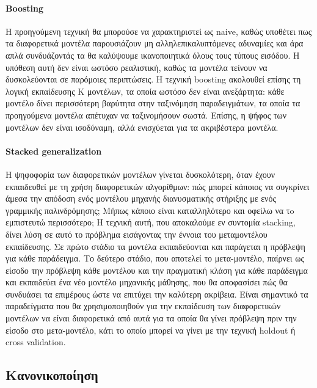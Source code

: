 \documentclass{article}
\begin{document}
\paragraph{Boosting} Η προηγούμενη τεχνική θα μπορούσε να χαρακτηριστεί ως naive, καθώς υποθέτει πως τα διαφορετικά μοντέλα παρουσιάζουν μη αλληλεπικαλυπτόμενες αδυναμίες και άρα απλά συνδυάζοντάς τα θα καλύψουμε ικανοποιητικά όλους τους τύπους εισόδου. Η υπόθεση αυτή δεν είναι ωστόσο ρεαλιστική, καθώς τα μοντέλα τείνουν να δυσκολεύονται σε παρόμοιες περιπτώσεις. Η τεχνική boosting ακολουθεί επίσης τη λογική εκπαίδευσης Κ μοντέλων, τα οποία ωστόσο δεν είναι ανεξάρτητα: κάθε μοντέλο δίνει περισσότερη βαρύτητα στην ταξινόμηση παραδειγμάτων, τα οποία τα προηγούμενα μοντέλα απέτυχαν να ταξινομήσουν σωστά. Επίσης, η ψήφος των μοντέλων δεν είναι ισοδύναμη, αλλά ενισχύεται για τα ακριβέστερα μοντέλα.
\paragraph{Stacked generalization} Η ψηφοφορία των διαφορετικών μοντέλων γίνεται δυσκολότερη, όταν έχουν εκπαιδευθεί με τη χρήση διαφορετικών αλγορίθμων: πώς μπορεί κάποιος να συγκρίνει άμεσα την απόδοση ενός μοντέλου μηχανής διανυσματικής στήριξης με ενός γραμμικής παλινδρόμησης; Μήπως κάποιο είναι καταλληλότερο και οφείλω να τo εμπιστευτώ περισσότερο; Η τεχνική αυτή, που αποκαλούμε εν συντομία stacking, δίνει λύση σε αυτό το πρόβλημα εισάγοντας την έννοια του μεταμοντέλου εκπαίδευσης. Σε πρώτο στάδιο τα μοντέλα εκπαιδεύονται και παράγεται η πρόβλεψη για κάθε παράδειγμα. Το δεύτερο στάδιο, που αποτελεί το μετα-μοντέλο, παίρνει ως είσοδο την πρόβλεψη κάθε μοντέλου και την πραγματική
κλάση για κάθε παράδειγμα και εκπαιδεύει ένα νέο μοντέλο μηχανικής μάθησης, που θα αποφασίσει πώς θα συνδυάσει τα επιμέρους ώστε να επιτύχει την καλύτερη ακρίβεια. Είναι σημαντικό τα παραδείγματα που θα χρησιμοποιηθούν για την εκπαίδευση των διαφορετικών μοντέλων να είναι διαφορετικά από αυτά για τα οποία θα γίνει πρόβλεψη πριν την είσοδο στο μετα-μοντέλο, κάτι το οποίο μπορεί να γίνει με την τεχνική holdout ή cross validation.
\subsection{Κανονικοποίηση}
\end{document}
